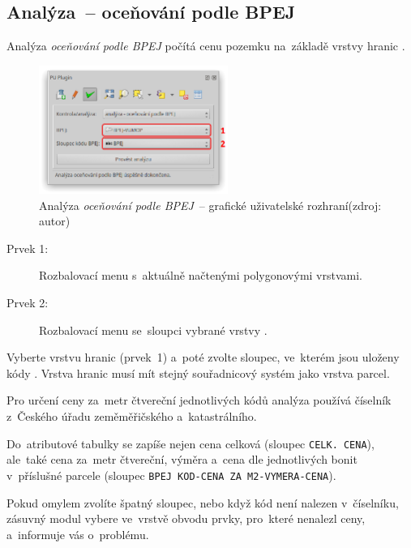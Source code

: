 \newpage

\subsection{Analýza~– oceňování podle BPEJ}
\label{manual_analyza_bpej}

Analýza \textit{oceňování podle BPEJ} počítá cenu pozemku na~základě
vrstvy hranic .

	\begin{figure}[H] \centering
		\includegraphics[width=0.55\textwidth]{./pictures/analyza_bpej.png}
		\caption[Analýza \textit{oceňování podle BPEJ}~–
grafické uživatelské rozhraní]{Analýza \textit{oceňování podle BPEJ}~–
grafické uživatelské rozhraní\newline (zdroj: autor)}
		\label{fig:manual_analyza_bpej_gui}
 	\end{figure}

\begin{description}
	\item[Prvek 1:] Rozbalovací menu s~aktuálně načtenými
polygonovými vrstvami.
	\item[Prvek 2:] Rozbalovací menu se~sloupci vybrané vrstvy
.
\end{description}

Vyberte vrstvu hranic  (prvek~1) a~poté zvolte sloupec,
ve~kterém jsou uloženy kódy . Vrstva hranic  musí
mít stejný souřadnicový systém jako vrstva parcel.

Pro určení ceny za~metr čtvereční jednotlivých kódů  analýza
používá číselník  z~Českého úřadu zeměměřičského
a~katastrálního.

Do~atributové tabulky se zapíše nejen cena celková (sloupec
\texttt{CELK. CENA}), ale~také cena za~metr čtvereční, výměra a~cena
dle jednotlivých bonit v~příslušné parcele (sloupec \texttt{BPEJ
KOD-CENA ZA M2-VYMERA-CENA}).

Pokud omylem zvolíte špatný slou\-pec, nebo když kód  není
nalezen v~číselníku, zásuvný modul vybere ve~vrstvě obvodu prvky,
pro~které nenalezl ceny, a~informuje vás o~problému.
